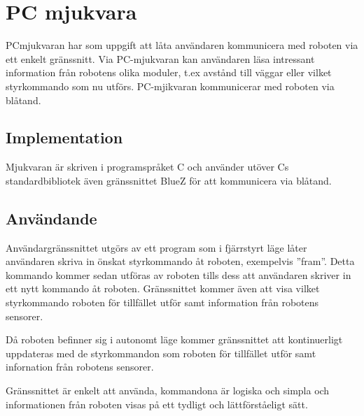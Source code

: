 \section{PC mjukvara}
PCmjukvaran har som uppgift att låta användaren kommunicera med roboten via ett
enkelt gränssnitt. Via PC-mjukvaran kan användaren läsa intressant information
från robotens olika moduler, t.ex avstånd till väggar eller vilket styrkommando
som nu utförs. PC-mjikvaran kommunicerar med roboten via blåtand.

\subsection{Implementation}

Mjukvaran är skriven i programspråket C och använder utöver Cs standardbibliotek
även gränssnittet BlueZ för att kommunicera via blåtand.

\subsection{Användande}

Användargränssnittet utgörs av ett program som i fjärrstyrt läge låter 
användaren skriva in önskat styrkommando åt roboten, exempelvis ''fram''. Detta
kommando kommer sedan utföras av roboten tills dess att användaren skriver in
ett nytt kommando åt roboten. Gränssnittet kommer även att visa vilket
styrkommando roboten för tillfället utför samt information från robotens
sensorer.

Då roboten befinner sig i autonomt läge kommer gränssnittet att kontinuerligt
uppdateras med de styrkommandon som roboten för tillfället utför samt
infornation från robotens sensorer. 

Gränssnittet är enkelt att använda, kommandona är logiska och simpla och
informationen från roboten visas på ett tydligt och lättförståeligt sätt.

% 
% 
% 
% 
% 
% 
% 
